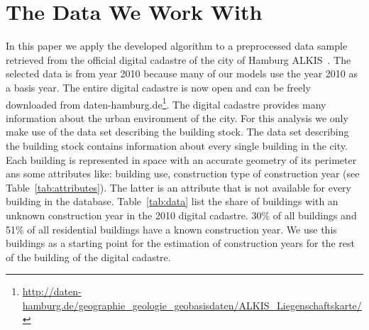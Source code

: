 \section{The Data We Work With}

In this paper we apply the developed algorithm to a preprocessed data sample
retrieved from the official digital cadastre of the city of Hamburg
ALKIS~\citep{AdV.2008}. The selected data is from year 2010 because many of our
models use the year 2010 as a basis year. The entire digital cadastre is now
open and can be freely downloaded from
daten-hamburg.de\footnote{\url{http://daten-hamburg.de/geographie_geologie_geobasisdaten/ALKIS_Liegenschaftskarte/}}.
%
The digital cadastre provides many information about the urban environment of
the city. For this analysis we only make use of the data set describing the
building stock.
%
The data set describing the building stock contains information about every
single building in the city. Each building is represented in space with an
accurate geometry of its perimeter ans some attributes like: building use,
construction type of construction year (see Table~\ref{tab:attributes}). The
latter is an attribute that is not available for every building in the
database. Table~\ref{tab:data} list the share of buildings with an unknown
construction year in the 2010 digital cadastre. 30\% of all buildings and 51\%
of all residential buildings have a known construction year. We use this
buildings as a starting point for the estimation of construction years for the
rest of the building of the digital cadastre.\\

